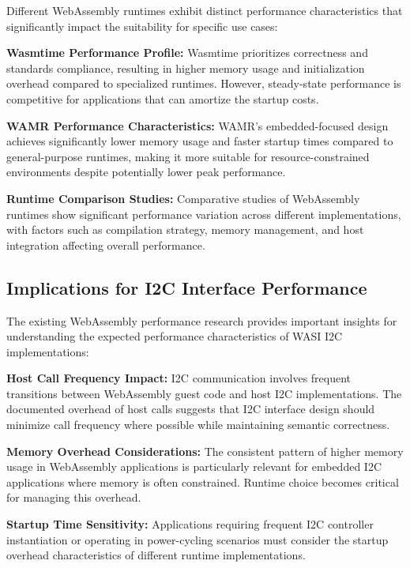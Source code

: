 Different WebAssembly runtimes exhibit distinct performance characteristics that significantly impact the suitability for specific use cases:

\textbf{Wasmtime Performance Profile:} Wasmtime prioritizes correctness and standards compliance, resulting in higher memory usage and initialization overhead compared to specialized runtimes. However, steady-state performance is competitive for applications that can amortize the startup costs\cite{wasmtime_benchmarks}.

\textbf{WAMR Performance Characteristics:} WAMR's embedded-focused design achieves significantly lower memory usage and faster startup times compared to general-purpose runtimes, making it more suitable for resource-constrained environments despite potentially lower peak performance\cite{wamr_performance}.

\textbf{Runtime Comparison Studies:} Comparative studies of WebAssembly runtimes show significant performance variation across different implementations, with factors such as compilation strategy, memory management, and host integration affecting overall performance\cite{runtime_benchmark_2023}.

\subsection{Implications for I2C Interface Performance}
\label{subsec:i2c-performance-implications}

The existing WebAssembly performance research provides important insights for understanding the expected performance characteristics of WASI I2C implementations:

\textbf{Host Call Frequency Impact:} I2C communication involves frequent transitions between WebAssembly guest code and host I2C implementations. The documented overhead of host calls suggests that I2C interface design should minimize call frequency where possible while maintaining semantic correctness.

\textbf{Memory Overhead Considerations:} The consistent pattern of higher memory usage in WebAssembly applications is particularly relevant for embedded I2C applications where memory is often constrained. Runtime choice becomes critical for managing this overhead.

\textbf{Startup Time Sensitivity:} Applications requiring frequent I2C controller instantiation or operating in power-cycling scenarios must consider the startup overhead characteristics of different runtime implementations.

